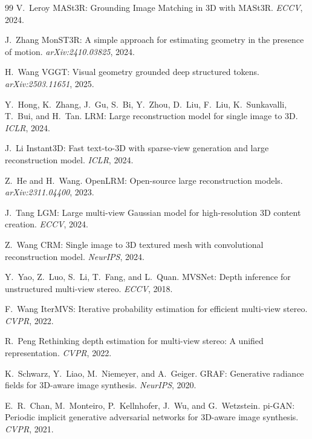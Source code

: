 \begin{thebibliography}{99}
V.~Leroy \etal
MASt3R: Grounding Image Matching in 3D with MASt3R.
\emph{ECCV}, 2024.


J.~Zhang \etal
MonST3R: A simple approach for estimating geometry in the presence of motion.
\emph{arXiv:2410.03825}, 2024.


H.~Wang \etal
VGGT: Visual geometry grounded deep structured tokens.
\emph{arXiv:2503.11651}, 2025.


Y.~Hong, K.~Zhang, J.~Gu, S.~Bi, Y.~Zhou, D.~Liu, F.~Liu, K.~Sunkavalli,
T.~Bui, and H.~Tan.
LRM: Large reconstruction model for single image to 3D.
\emph{ICLR}, 2024.


J.~Li \etal
Instant3D: Fast text-to-3D with sparse-view generation and large reconstruction model.
\emph{ICLR}, 2024.


Z.~He and H.~Wang.
OpenLRM: Open-source large reconstruction models.
\emph{arXiv:2311.04400}, 2023.


J.~Tang \etal
LGM: Large multi-view Gaussian model for high-resolution 3D content creation.
\emph{ECCV}, 2024.


Z.~Wang \etal
CRM: Single image to 3D textured mesh with convolutional reconstruction model.
\emph{NeurIPS}, 2024.


Y.~Yao, Z.~Luo, S.~Li, T.~Fang, and L.~Quan.
MVSNet: Depth inference for unstructured multi-view stereo.
\emph{ECCV}, 2018.


F.~Wang \etal
IterMVS: Iterative probability estimation for efficient multi-view stereo.
\emph{CVPR}, 2022.


R.~Peng \etal
Rethinking depth estimation for multi-view stereo: A unified representation.
\emph{CVPR}, 2022.


K.~Schwarz, Y.~Liao, M.~Niemeyer, and A.~Geiger.
GRAF: Generative radiance fields for 3D-aware image synthesis.
\emph{NeurIPS}, 2020.


E.~R.~Chan, M.~Monteiro, P.~Kellnhofer, J.~Wu, and G.~Wetzstein.
pi-GAN: Periodic implicit generative adversarial networks for 3D-aware image
synthesis.
\emph{CVPR}, 2021.



\end{thebibliography}
